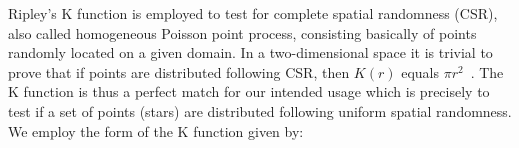 \documentclass[draft]{aa}
\begin{document}
 Ripley's K function is employed to test for complete spatial randomness (CSR),
 also called homogeneous Poisson point process, consisting basically of
 points randomly located on a given domain. In a two-dimensional space it is
 trivial to prove that if points are distributed following CSR, then $K(r)$
 equals $\pi r^2$~\citep{Streib_2011}.
 The K function is thus a perfect match for our intended usage which is
 precisely to test if a set of points (stars) are distributed following
 uniform spatial randomness.
 We employ the form of the K function given by:





\end{document}
